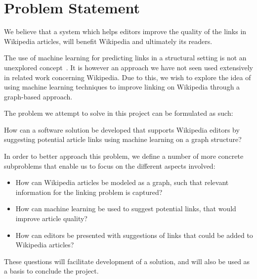 \section{Problem Statement}\label{sec:problem_statement}
We believe that a system which helps editors improve the quality of the links in Wikipedia articles, will benefit Wikipedia and ultimately its readers.

The use of machine learning for predicting links in a structural setting is not an unexplored concept~\cite{tang2015line,al2006link}. It is however an approach we have not seen used extensively in related work concerning Wikipedia. Due to this, we wish to explore the idea of using machine learning techniques to improve linking on Wikipedia through a graph-based approach.

The problem we attempt to solve in this project can be formulated as such:
\newcommand{\problemstatement}{
\begin{formal}
How can a software solution be developed that supports Wikipedia editors by suggesting potential article links using machine learning on a graph structure?
\end{formal}}

\problemstatement

In order to better approach this problem, we define a number of more concrete subproblems that enable us to focus on the different aspects involved:

\newcommand{\subproblemone}{How can Wikipedia articles be modeled as a graph, such that relevant information for the linking problem is captured?}
\newcommand{\subproblemtwo}{How can machine learning be used to suggest potential links, that would improve article quality?}
\newcommand{\subproblemthree}{How can editors be presented with suggestions of links that could be added to Wikipedia articles?}

\newcommand{\subproblems}{
\begin{itemize}
  \item \subproblemone
  \item \subproblemtwo
  \item \subproblemthree
\end{itemize}}

\subproblems

These questions will facilitate development of a solution, and will also be used as a basis to conclude the project.

